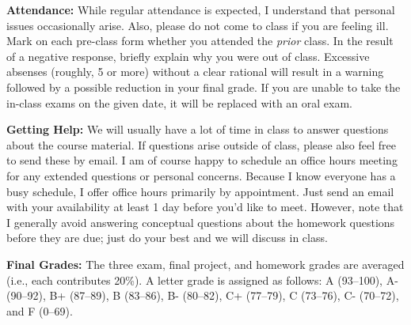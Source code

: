 \documentclass[11pt, a4paper]{article}
\begin{document}
\bigskip

\textbf{Attendance:}
While regular attendance is expected, I understand that personal issues 
occasionally arise. Also, please do not come to class if you are feeling ill.
Mark on each pre-class form whether you attended the \textit{prior} class.
In the result of a negative response, briefly explain why you were out of
class. Excessive absenses (roughly, 5 or more) without a clear rational
will result in a warning followed by a possible reduction in your final grade.
If you are unable to take the in-class exams on the given date, it will be
replaced with an oral exam.

\bigskip

\textbf{Getting Help:}
We will usually have a lot of time in class to answer questions about the course
material. If questions arise outside of class, please also feel free to send
these by email. I am of course happy to schedule an office hours meeting for
any extended questions or personal concerns. Because I know everyone has a
busy schedule, I offer office hours primarily by appointment. Just send an
email with your availability at least 1 day before you'd like to meet. However,
note that I generally avoid answering conceptual questions about the homework
questions before they are due; just do your best and we will discuss in class.

\bigskip

\textbf{Final Grades:}
The three exam, final project, and homework grades are averaged (i.e., each
contributes 20\%). A letter grade is assigned as follows:
             A (93--100), A- (90--92),
B+ (87--89), B (83--86),  B- (80--82),
C+ (77--79), C (73--76),  C- (70--72), and F (0--69).
\end{document}
